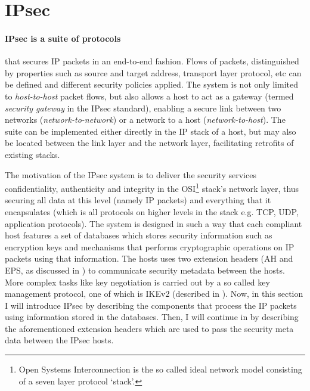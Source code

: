 \documentclass[final,a4paper,twoside,11pt,onecolumn]{report}
\begin{document}
\section{IPsec}

\paragraph{IPsec is a suite of protocols} that secures IP packets in an end-to-end fashion. Flows of packets, distinguished by properties such as source and target address, transport layer protocol, etc can be defined and different security policies applied. The system is not only limited to \emph{host-to-host} packet flows, but also allows a host to act as a gateway (termed \emph{security gateway} in the IPsec standard), enabling a secure link between two networks (\emph{network-to-network}) or a network to a host (\emph{network-to-host}). The suite can be implemented either directly in the IP stack of a host, but may also be located between the link layer and the network layer\citep[section 3.3]{rfc4301}, facilitating retrofits of existing stacks.

The motivation of the IPsec system is to deliver the security services confidentiality, authenticity and integrity in the OSI\footnote{Open Systems Interconnection is the so called ideal network model consisting of a seven layer protocol `stack'.}  stack's network layer, thus securing all data at this level (namely IP packets) and everything that it encapsulates (which is all protocols on higher levels in the stack e.g. TCP, UDP, application protocols). The system is designed in such a way that each compliant host features a set of databases which stores security information such as encryption keys and mechanisms that performs cryptographic operations on IP packets using that information. The hosts uses two extension headers (AH and EPS, as discussed in ) to communicate security metadata between the hosts. More complex tasks like key negotiation is carried out by a so called key management protocol, one of which is IKEv2 (described in ). Now, in this section I will introduce IPsec by describing the components that process the IP packets using information stored in the databases. Then, I will continue in  by describing the aforementioned extension headers which are used to pass the security meta data between the IPsec hosts.

\end{document}
